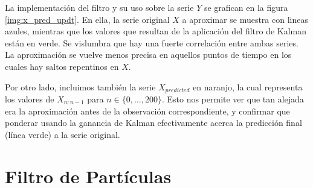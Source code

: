 \documentclass[letterpaper,11pt,oneside]{article}
\begin{document}

La implementación del filtro y su uso sobre la serie $Y$ se grafican en la figura \ref{img:x_pred_updt}. En ella, la serie original $X$ a aproximar se muestra con lineas azules, mientras que los valores que resultan de la aplicación del filtro de Kalman están en verde. Se vislumbra que hay una fuerte correlación entre ambas series. La aproximación se vuelve menos precisa en aquellos puntos de tiempo en los cuales hay saltos repentinos en $X$.


Por otro lado, incluimos también la serie $X_{predicted}$ en naranjo, la cual representa los valores de $X_{n:n-1}$ para $n\in\{0,\dots,200\}$. Esto nos permite ver que tan alejada era la aproximación antes de la observación correspondiente, y confirmar que ponderar usando la ganancia de Kalman efectivamente acerca la predicción final (línea verde) a la serie original.

\section{Filtro de Partículas}

\end{document}
